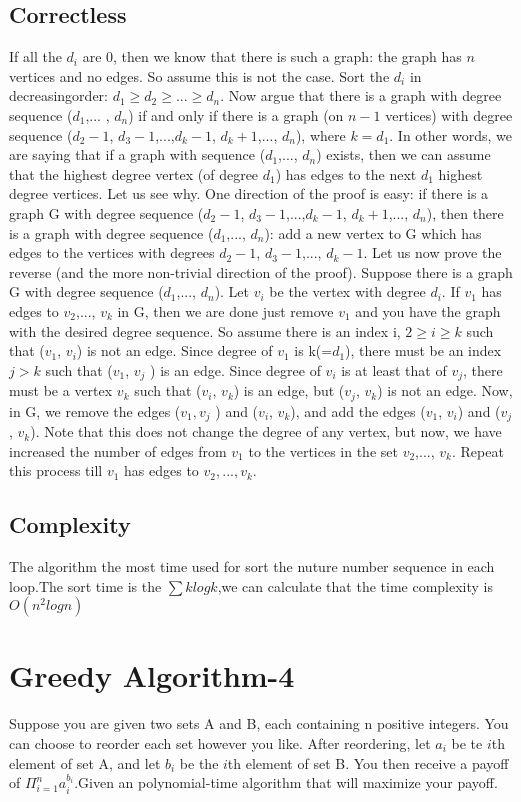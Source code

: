 \documentclass{article}
\numberwithin{equation}{section}
\begin{document}
    \subsection{Correctless}
    If all the $d_i$ are 0, then we know that there is such a graph: the graph has $n$ vertices and no edges. So assume this is not the case. Sort the $d_i$ in decreasingorder: $d_1 \geq d_2 \geq...\geq d_n$. Now argue that there is a graph with degree sequence ($d_1$,... , $d_n$) if and only if there is a graph (on $n - 1$ vertices) with degree sequence ($d_2 - 1$, $d_3 - 1$,...,$ d_k - 1$, $d_k+1$,..., $d_n$), where $k = d_1$. In other words, we are saying that if a graph with sequence ($d_1$,..., $d_n$) exists, then we can assume that the highest degree vertex (of degree $d_1$) has edges to the next $d_1$ highest degree vertices. 
    Let us see why. One direction of the proof is easy: if there is a graph G with degree sequence ($d_2 - 1$, $d_3 - 1$,...,$ d_k - 1$, $d_k+1$,..., $d_n$), then there is a graph with degree sequence ($d_1$,..., $d_n$): add a new vertex to G which has edges to the vertices with degrees $d_2 - 1$, $d_3 - 1$,..., $d_k - 1$. Let us now prove the reverse (and the more non-trivial direction of the proof).
    Suppose there is a graph G with degree sequence ($d_1$,..., $d_n$).
    Let $v_i$ be the vertex with degree $d_i$. If $v_1$ has edges to $v_2$,..., $v_k$ in G, then we are done
    just remove $v_1$ and you have the graph with the desired degree sequence. So assume there is an index i, $2 \geq i \geq k$ such that ($v_1$, $v_i$) is not an edge. Since degree of $v_1$ is k(=$d_1$), there must be an index $j > k$ such that ($v_1$, $v_j$ ) is an edge. Since degree of $v_i$
    is at least that of $v_j$, there must be a vertex $v_k$ such that ($v_i$, $v_k$) is an edge, but ($v_j$, $v_k$) is not an edge. Now, in G, we remove the edges ($v_1, v_j$ ) and ($v_i$, $v_k$), and add the edges
    ($v_1$, $v_i$) and ($v_j$, $v_k$). Note that this does not change the degree of any vertex, but now,
    we have increased the number of edges from $v_1$ to the vertices in the set {$v_2$,..., $v_k$}.
    Repeat this process till $v_1$ has edges to {$v_2,...,v_k$}.
    \subsection{Complexity}
    The algorithm the most time used for sort the nuture number sequence in each loop.The sort time is the 
    $\sum{klogk}$,we can calculate that the time complexity is $O(n^2logn)$
%
%
\section{Greedy Algorithm-4}
Suppose you are given two sets A and B, each containing n positive integers. 
You can choose to reorder each set however you like. After reordering, let $a_i$ be te $i$th element of set A, and let $b_i$ be the $i$th element of set B. 
You then receive a payoff of $\textstyle\Pi_{i=1}^n a_i^{b_i}$.Given an polynomial-time algorithm that will maximize your payoff.
\end{document}
